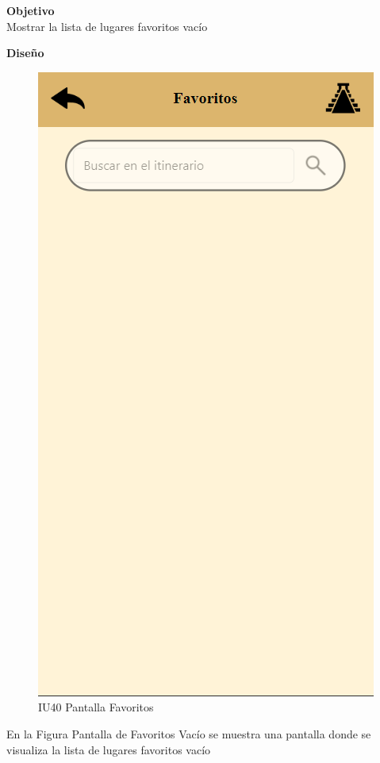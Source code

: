 \textbf{Objetivo} \\
Mostrar la lista de lugares favoritos vacío
\vspace{15pt}

\textbf{Diseño}

    \begin{figure}[htbp]
        
            \centering
            \includegraphics[width=.4\linewidth]{entregable final/pantallasSistema/IU18 Pantalla Favoritos.png}
        \caption{IU40 Pantalla Favoritos}
    
    \end{figure}

En la Figura Pantalla de Favoritos Vacío se muestra una pantalla donde se visualiza la lista de lugares favoritos vacío

